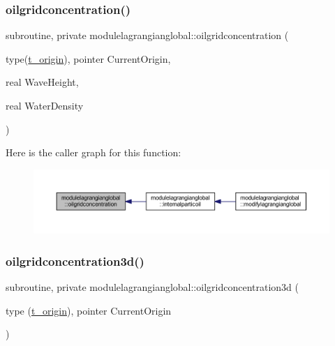 \subsubsection{\texorpdfstring{oilgridconcentration()}{oilgridconcentration()}}
{\footnotesize\ttfamily subroutine, private modulelagrangianglobal\+::oilgridconcentration (\begin{DoxyParamCaption}\item[{type(\mbox{\hyperlink{structmodulelagrangianglobal_1_1t__origin}{t\+\_\+origin}}), pointer}]{Current\+Origin,  }\item[{real}]{Wave\+Height,  }\item[{real}]{Water\+Density }\end{DoxyParamCaption})\hspace{0.3cm}{\ttfamily [private]}}

Here is the caller graph for this function\+:\nopagebreak
\begin{figure}[H]
\begin{center}
\leavevmode
\includegraphics[width=350pt]{namespacemodulelagrangianglobal_a062a888cb9da76f6463a22370b86c56a_icgraph}
\end{center}
\end{figure}
\mbox{\label{namespacemodulelagrangianglobal_a0f83256f515b161c9b16d0c3ed51d10b}} 
\subsubsection{\texorpdfstring{oilgridconcentration3d()}{oilgridconcentration3d()}}
{\footnotesize\ttfamily subroutine, private modulelagrangianglobal\+::oilgridconcentration3d (\begin{DoxyParamCaption}\item[{type (\mbox{\hyperlink{structmodulelagrangianglobal_1_1t__origin}{t\+\_\+origin}}), pointer}]{Current\+Origin }\end{DoxyParamCaption})\hspace{0.3cm}{\ttfamily [private]}}

